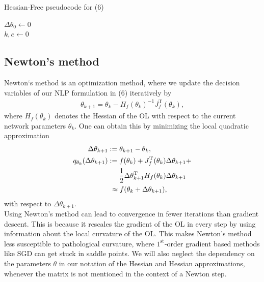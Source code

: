 \documentclass[conference]{IEEEtran}
\begin{document}
	\begin{algorithm}
		\caption{Hessian-Free pseudocode for (6)}\label{alg:two}
		$\Delta\theta_{0}\gets 0$\\
		$k, e\gets 0$\\
		\KwOut{$\theta^{\star}$}
	\end{algorithm}


	\subsection{Newton's method}
	\noindent
	Newton`s method is an optimization method, where we update the decision variables of our NLP formulation in (6) iteratively by
	\begin{align}
	\theta_{k+1} = \theta_{k} -H_{f}(\theta_{k})^{-1} J_{f}^{\mathrm{T}}(\theta_{k}),
	\end{align}
	where $H_{f}(\theta_{k})$ denotes the Hessian of the OL with respect to the current network parameters $\theta_{k}$. One can obtain this by minimizing the local quadratic approximation
	\begin{align}
	\text{ }\Delta\theta_{k+1} &:= \theta_{k+1} - \theta_{k},\\
	q_{\theta_{k}}(\Delta\theta_{k+1})&:= f(\theta_{k}) + J_{f}^{\mathrm{T}}(\theta_{k})\Delta\theta_{k+1} + \notag\\
	&\:\:\:\:\:\:\:\frac{1}{2}\Delta\theta_{k+1}^{\mathrm{T}}H_{f}(\theta_{k})\Delta\theta_{k+1}\\
	&\text{ }\approx f(\theta_{k} + \Delta\theta_{k+1}),
	\end{align}
	with respect to $\Delta\theta_{k+1}$. \\
	Using Newton's method can lead to convergence in fewer iterations than gradient descent. This is because
	it rescales the gradient of the OL in every step by using information about the local curvature of the OL. This makes Newton's method less susceptible to pathological curvature, where
	$1^{\text{st}}$-order gradient based methods like SGD can get stuck in saddle points. We will also neglect the dependency on the parameters $\theta$ in our notation of the Hessian and Hessian approximations, whenever the matrix is not mentioned in the context of a Newton step.
\end{document}
